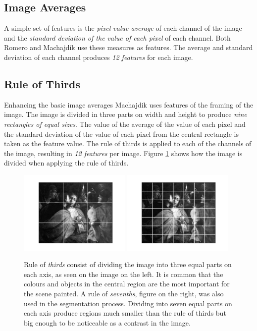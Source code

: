 \documentclass[11pt,a4paper,twoside,openright]{report}
\begin{document}
\subsection{Image Averages}

A simple set of features is the \emph{pixel value average} of each channel of
the image and the \emph{standard deviation of the value of each pixel} of each
channel.  Both Romero \cite{jma12clas} and Machajdik \cite{mach10clas} use
these measures as features.  The average and standard deviation of each channel
produces \emph{12 features} for each image.

\subsection{Rule of Thirds}

Enhancing the basic image averages Machajdik \cite{mach10clas} uses features of
the framing of the image.  The image is divided in three parts on width and
height to produce \emph{nine rectangles of equal sizes}.  The value of the
average of the value of each pixel and the standard deviation of the value of
each pixel from the central rectangle is taken as the feature value.  The rule
of thirds is applied to each of the channels of the image, resulting in
\emph{12 features} per image.  Figure \ref{fig:r3} shows how the image is
divided when applying the rule of thirds.

\begin{figure}[tbp]
\centering
\includegraphics[width=0.48\textwidth]{r3_L_caravaggio_1962_139_1}
\includegraphics[width=0.48\textwidth]{r7_L_caravaggio_1962_139_1}
\caption[Rule of thirds]{Rule of \emph{thirds} consist of dividing the image
into three equal parts on each axis, as seen on the image on the left.  It is
common that the colours and objects in the central region are the most
important for the scene painted.  A rule of \emph{sevenths}, figure on the
right, was also used in the segmentation process.  Dividing into seven equal
parts on each axis produce regions much smaller than the rule of thirds but big
enough to be noticeable as a contrast in the image.}
\label{fig:r3}
\end{figure}
\end{document}

